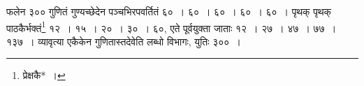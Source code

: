 \documentclass[10pt, openany]{book}
\begin{document}
{{
{फलेन ३०० गुणितं गुण्यच्छेदेन पञ्चभिरपवर्तितं ६०~। ६०~। ६०~। ६०~। ६०~।
पृथक् पृथक्}
{पाठकैर्भक्तं\renewcommand{\thefootnote}{\s ७}\footnote{\s प्रेक्षकै*~।} १२~। १५~। २०~। ३०~। ६०, एते पूर्वयुक्ता जाताः १२~। २७~। ४७~। ७७~।}
{१३७~। व्यावृत्या एकैकेन गुणितास्तदेवेति लब्धो विभागः, युतिः ३००~।}

}}
\end{document}
